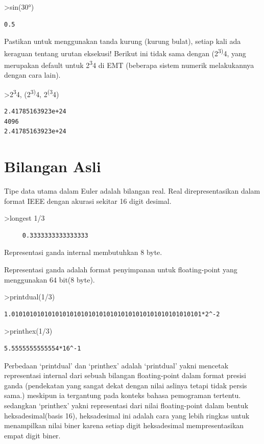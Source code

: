 \documentclass[
]{book}
\begin{document}
\textgreater sin(30°)

\begin{verbatim}
0.5
\end{verbatim}

Pastikan untuk menggunakan tanda kurung (kurung bulat), setiap kali ada keraguan tentang urutan eksekusi! Berikut ini tidak sama dengan (2\textsuperscript{3)}4, yang merupakan default untuk 2\textsuperscript{3}4 di EMT (beberapa sistem numerik melakukannya dengan cara lain).

\textgreater2\textsuperscript{3}4, (2\textsuperscript{3)}4, 2\textsuperscript{(3}4)

\begin{verbatim}
2.41785163923e+24
4096
2.41785163923e+24
\end{verbatim}

\section{Bilangan Asli}\label{bilangan-asli}

Tipe data utama dalam Euler adalah bilangan real. Real direpresentasikan dalam format IEEE dengan akurasi sekitar 16 digit desimal.

\textgreater longest 1/3

\begin{verbatim}
     0.3333333333333333 
\end{verbatim}

Representasi ganda internal membutuhkan 8 byte.

Representasi ganda adalah format penyimpanan untuk floating-point yang menggunakan 64 bit(8 byte).

\textgreater printdual(1/3)

\begin{verbatim}
1.0101010101010101010101010101010101010101010101010101*2^-2
\end{verbatim}

\textgreater printhex(1/3)

\begin{verbatim}
5.5555555555554*16^-1
\end{verbatim}

Perbedaan `printdual' dan `printhex' adalah `printdual' yakni mencetak representasi internal dari sebuah bilangan floating-point dalam format presisi ganda (pendekatan yang sangat dekat dengan nilai aslinya tetapi tidak persis sama.) meskipun ia tergantung pada konteks bahasa pemograman tertentu. sedangkan `printhex' yakni representasi dari nilai floating-point dalam bentuk heksadesimal(basis 16), heksadesimal ini adalah cara yang lebih ringkas untuk menampilkan nilai biner karena setiap digit heksadesimal mempresentasikan empat digit biner.
\end{document}
